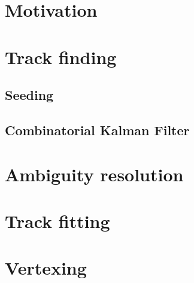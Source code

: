 \section{Motivation}


\section{Track finding}

\subsection{Seeding}


\subsection{Combinatorial Kalman Filter}


\section{Ambiguity resolution}

\section{Track fitting}


\section{Vertexing}
